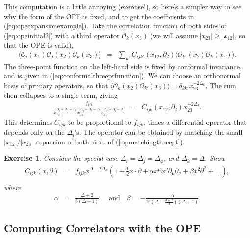 \documentclass[11pt]{ws-rv9x6}
\newcommand\be{\begin{eqnarray}}
\newcommand\ee{\end{eqnarray}}
\newcommand\f\phi
\newcommand\cO{\mathcal{O}}
\newcommand\p[1]{\left(#1\right)}
\newcommand\ptl\partial
\newcommand\<\langle
\renewcommand\>\rangle
\newcommand\de\delta
\newcommand\nn{\nonumber}
\renewcommand\.{\cdot}
\newcommand\De{\Delta}
\renewcommand\b\beta
\renewcommand\a\alpha
\newtheorem{exercise}{Exercise}[section]
\begin{document}
This computation is a little annoying (exercise!), so here's a simpler way to see why the form of the OPE is fixed, and to get the coefficients in (\ref{eq:opeexpansionexample}).  Take the correlation function of both sides of (\ref{eq:opeinitial2}) with a third operator $\cO_k(x_3)$ (we will assume $|x_{23}|\geq |x_{12}|$, so that the OPE is valid),
\be
\label{eq:threetotwo}
\<\cO_i(x_1)\cO_j(x_2)\cO_k(x_3)\> &=& \sum_{k'} C_{ijk'}(x_{12},\ptl_2)\<\cO_{k'}(x_2)\cO_k(x_3)\>.
\ee
The three-point function on the left-hand side is fixed by conformal invariance, and is given in  (\ref{eq:conformalthreeptfunction}). We can choose an orthonormal basis of primary operators, so that $\<\cO_k(x_2)\cO_{k'}(x_3)\>= \de_{kk'}x_{23}^{-2\De_k}$.  The sum then collapses to a single term, giving
\be
\label{eq:matchingthreept}
\frac{f_{ijk}}{x_{12}^{\De_i+\De_j-\De_k}x_{23}^{\De_j+\De_k-\De_i}x_{31}^{\De_k+\De_i-\De_j}} &=& C_{ijk}(x_{12},\ptl_2)x_{23}^{-2\De_k}.
\ee
This determines $C_{ijk}$ to be proportional to $f_{ijk}$, times a differential operator that depends only on the $\De_i$'s. The operator can be obtained by matching the small $|x_{12}|/|x_{23}|$ expansion of both sides of (\ref{eq:matchingthreept}).
\begin{exercise}
\label{exercise:seriesfordiffops}
Consider the special case $\De_i=\De_j=\De_\f$, and $\De_k=\De$.  Show
\be
\label{eq:identicalscalaropeoperator}
C_{ijk}(x,\ptl) &=& f_{ijk} x^{\De-2\De_\f}\p{1+\frac 1 2 x\.\ptl + \a x^\mu x^\nu\ptl_\mu\ptl_\nu + \b x^2 \ptl^2+\dots},\nn\\
\ee
where
\be
\label{eq:opedescendantcoefficients}
\a &=& \frac{\De+2}{8(\De+1)},\quad\textrm{and}\quad \b=-\frac{\De}{16(\De-\frac{d-2}{2})(\De+1)}.
\ee
\end{exercise}

\subsection{Computing Correlators with the OPE}
\end{document}
